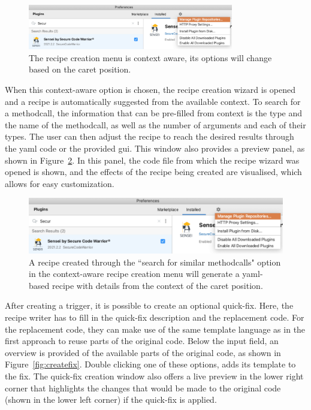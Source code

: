 \begin{figure}[t]
  \centering
  \includegraphics[width=0.8\textwidth,page=11]{04-tools/figures/figures2.pdf}
  \caption[Context-aware recipe creation menu]{The recipe creation menu is context aware, its options will change based on the caret position.}
  \label{fig:newrecipemethodcall} 
\end{figure}

When this context-aware option is chosen, the recipe creation wizard is opened and a recipe is automatically suggested from the available context.
To search for a methodcall, the information that can be pre-filled from context is the type and the name of the methodcall, as well as the number of arguments and each of their types.
The user can then adjust the recipe to reach the desired results through the \gls{yaml} code or the provided \gls{gui}.
This window also provides a preview panel, as shown in Figure~\ref{fig:recipewizard1}.
In this panel, the code file from which the recipe wizard was opened is shown, and the effects of the recipe being created are visualised, which allows for easy customization.

\begin{figure}
  \centering
  \includegraphics[width=\textwidth,page=10]{04-tools/figures/figures2.pdf}
  \caption[Recipe created from context]{A recipe created through the ``search for similar methodcalls" option in the context-aware recipe creation menu will generate a \gls{yaml}-based recipe with details from the context of the caret position.}
  \label{fig:recipewizard1} 
\end{figure}

After creating a trigger, it is possible to create an optional quick-fix.
Here, the recipe writer has to fill in the quick-fix description and the replacement code.
For the replacement code, they can make use of the same template language as in the first approach to reuse parts of the original code.
Below the input field, an overview is provided of the available parts of the original code, as shown in Figure~\ref{fig:createfix}.
Double clicking one of these options, adds its template to the fix.
The quick-fix creation window also offers a live preview in the lower right corner that highlights the changes that would be made to the original code (shown in the lower left corner) if the quick-fix is applied.

